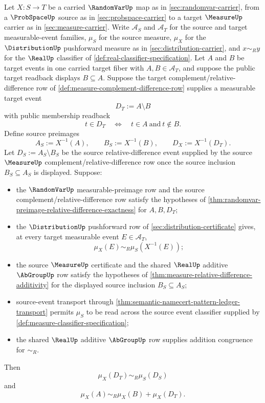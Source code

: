\begin{theorem}
\label{thm:distribution-pushforward-relative-difference-additivity}
Let $X:S\to T$ be a carried $\RandomVarUp$ map as in \autoref{sec:randomvar-carrier}, from a $\ProbSpaceUp$ source as in \autoref{sec:probspace-carrier} to a target $\MeasureUp$ carrier as in \autoref{sec:measure-carrier}. Write $\mathcal{A}_S$ and $\mathcal{A}_T$ for the source and target measurable-event families, $\mu_S$ for the source measure, $\mu_X$ for the $\DistributionUp$ pushforward measure as in \autoref{sec:distribution-carrier}, and $x\sim_R y$ for the $\RealUp$ classifier of \autoref{def:real-classifier-specification}. Let $A$ and $B$ be target events in one carried target fiber with $A,B\in\mathcal{A}_T$, and suppose the public target readback displays $B\subseteq A$. Suppose the target complement/relative-difference row of \autoref{def:measure-complement-difference-row} supplies a measurable target event
$$
D_T:=A\setminus B
$$
with public membership readback
$$
t\in D_T\quad\Longleftrightarrow\quad t\in A\ \text{and}\ t\notin B.
$$
Define source preimages
$$
A_S:=X^{-1}(A),\qquad B_S:=X^{-1}(B),\qquad D_X:=X^{-1}(D_T).
$$
Let $D_S:=A_S\setminus B_S$ be the source relative-difference event supplied by the source $\MeasureUp$ complement/relative-difference row once the source inclusion $B_S\subseteq A_S$ is displayed. Suppose:
\begin{itemize}
\item the $\RandomVarUp$ measurable-preimage row and the source complement/relative-difference row satisfy the hypotheses of \autoref{thm:randomvar-preimage-relative-difference-exactness} for $A,B,D_T$;
\item the $\DistributionUp$ pushforward row of \autoref{sec:distribution-certificate} gives, at every target measurable event $E\in\mathcal{A}_T$,
$$
\mu_X(E)\sim_R\mu_S(X^{-1}(E));
$$
\item the source $\MeasureUp$ certificate and the shared $\RealUp$ additive $\AbGroupUp$ row satisfy the hypotheses of \autoref{thm:measure-relative-difference-additivity} for the displayed source inclusion $B_S\subseteq A_S$;
\item source-event transport through \autoref{thm:semantic-namecert-pattern-ledger-transport} permits $\mu_S$ to be read across the source event classifier supplied by \autoref{def:measure-classifier-specification};
\item the shared $\RealUp$ additive $\AbGroupUp$ row supplies addition congruence for $\sim_R$.
\end{itemize}
Then
$$
\mu_X(D_T)\sim_R\mu_S(D_S)
$$
and
$$
\mu_X(A)\sim_R\mu_X(B)+\mu_X(D_T).
$$
\end{theorem}
